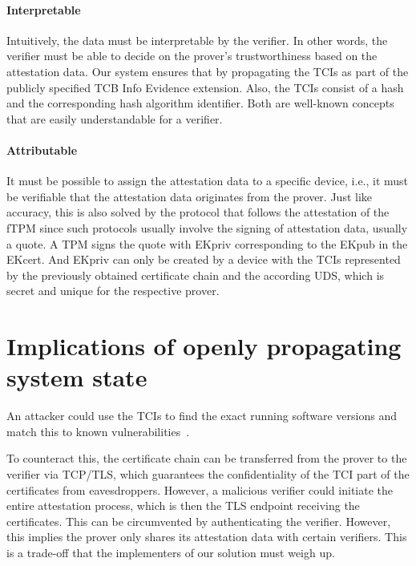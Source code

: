 \paragraph{Interpretable}
Intuitively, the data must be interpretable by the verifier.
In other words, the verifier must be able to decide on the prover's trustworthiness based on the attestation data.
Our system ensures that by propagating the TCIs as part of the publicly specified TCB Info Evidence extension.
Also, the TCIs consist of a hash and the corresponding hash algorithm identifier.
Both are well-known concepts that are easily understandable for a verifier.

\paragraph{Attributable}
It must be possible to assign the attestation data to a specific device, i.e., it must be verifiable that the attestation data originates from the prover.
Just like accuracy, this is also solved by the protocol that follows the attestation of the fTPM since such protocols usually involve the signing of attestation data, usually a quote.
A \ac{TPM} signs the quote with EKpriv corresponding to the EKpub in the EKcert.
And EKpriv can only be created by a device with the \acp{TCI} represented by the previously obtained certificate chain and the according \ac{UDS}, which is secret and unique for the respective prover.



\section{Implications of openly propagating system state}

An attacker could use the TCIs to find the exact running software versions and match this to known vulnerabilities~\cite{rfc9334}.

To counteract this, the certificate chain can be transferred from the prover to the verifier via TCP/TLS, which guarantees the confidentiality of the TCI part of the certificates from eavesdroppers.
However, a malicious verifier could initiate the entire attestation process, which is then the TLS endpoint receiving the certificates.
This can be circumvented by authenticating the verifier.
However, this implies the prover only shares its attestation data with certain verifiers.
This is a trade-off that the implementers of our solution must weigh up.


